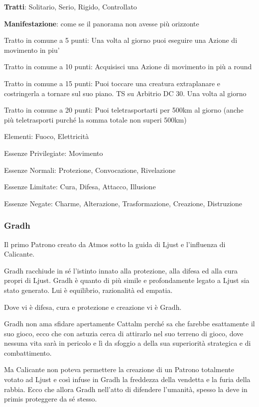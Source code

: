 \documentclass[a4paper,11pt,twoside,openany]{book}
\begin{document}
\textbf{Tratti}: Solitario, Serio, Rigido, Controllato

\textbf{Manifestazione}: come se il panorama non avesse più orizzonte

\bigskip

Tratto in comune a 5 punti: Una volta al giorno puoi eseguire una Azione di movimento in piu'

Tratto in comune a 10 punti: Acquisisci una Azione di movimento in più a round

Tratto in comune a 15 punti: Puoi toccare una creatura extraplanare e costringerla a tornare sul suo piano. TS su Arbitrio DC 30. Una volta al giorno

Tratto in comune a 20 punti: Puoi teletrasportarti per 500km al giorno (anche più teletrasporti purché la somma totale non superi 500km)

\bigskip

Elementi: Fuoco, Elettricità

\bigskip

Essenze Privilegiate: Movimento

Essenze Normali: Protezione, Convocazione, Rivelazione

Essenze Limitate: Cura, Difesa, Attacco, Illusione

Essenze Negate: Charme, Alterazione, Trasformazione, Creazione, Distruzione

\subsubsection{Gradh}

\label{gradh}

Il primo Patrono creato da Atmos sotto la guida di Ljust e l'influenza di Calicante.

Gradh racchiude in sé l'istinto innato alla protezione, alla difesa ed alla cura propri di Ljust. Gradh è quanto di più simile e profondamente legato a Ljust sia stato generato. Lui è equilibrio, razionalità ed empatia.

Dove vi è difesa, cura e protezione e creazione vi è Gradh.

Gradh non ama sfidare apertamente Cattalm perché sa che farebbe esattamente il suo gioco, ecco che con astuzia cerca di attirarlo nel suo terreno di gioco, dove nessuna vita sarà in pericolo e lì da sfoggio a della sua superiorità strategica e di combattimento.

Ma Calicante non poteva permettere la creazione di un Patrono totalmente votato ad Ljust e così infuse in Gradh la freddezza della vendetta e la furia della rabbia. Ecco che allora Gradh nell'atto di difendere l'umanità, spesso la deve in primis proteggere da sé stesso.
\end{document}
